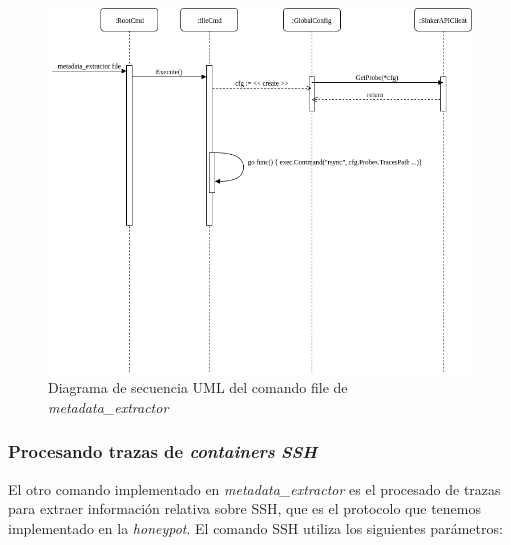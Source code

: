 \begin{figure}[htp]
    \centering
      \includegraphics[scale=0.4]{images/UMLSequenceFileOp}
    \caption{Diagrama de secuencia UML del comando file de \emph{metadata\_extractor}}
    \label{fig:uml-sequence-file-metadata-extractor}
\end{figure}

\subsubsection{Procesando trazas de \emph{containers} \emph{SSH}}

El otro comando implementado en \emph{metadata\_extractor} es el procesado de trazas para extraer información relativa sobre
SSH, que es el protocolo que tenemos implementado en la \emph{honeypot}. El comando SSH utiliza los siguientes parámetros:

